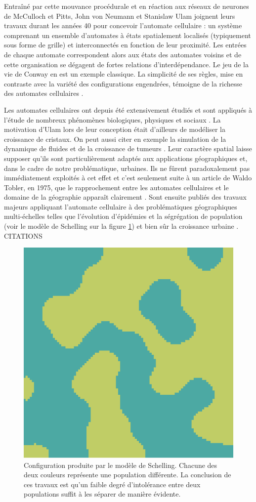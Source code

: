 \documentclass[12pt]{article}
\begin{document}
Entraîné par cette mouvance procédurale et en réaction aux réseaux de
neurones de McCulloch et Pitts, John von Neumann et Stanislaw Ulam
joignent leurs travaux durant les années 40 pour concevoir l'automate
cellulaire : un système comprenant un ensemble d'automates à états
spatialement localisés (typiquement sous forme de grille) et
interconnectés en fonction de leur proximité. Les entrées de chaque
automate correspondent alors aux états des automates voisins et de
cette organisation se dégagent de fortes relations
d'interdépendance. Le jeu de la vie de Conway en est un exemple
classique. La simplicité de ses règles, mise en contraste avec la
variété des configurations engendrées, témoigne de la richesse des
automates cellulaires \cite{Gardner1970}.

Les automates cellulaires ont depuis été extensivement étudiés et sont
appliqués à l'étude de nombreux phénomènes biologiques, physiques et
sociaux \cite{Ganguly2003}. La motivation d'Ulam lors de leur
conception était d'ailleurs de modéliser la croissance de cristaux. On
peut aussi citer en exemple la simulation de la dynamique de fluides
\cite{Frisch1986} et de la croissance de tumeurs
\cite{Kansal2000}. Leur caractère spatial laisse supposer qu'ils sont
particulièrement adaptés aux applications géographiques et, dans le
cadre de notre problématique, urbaines. Ils ne fûrent paradoxalement
pas immédiatement exploités à cet effet et c'est seulement suite à un
article de Waldo Tobler, en 1975, que le rapprochement entre les
automates cellulaires et le domaine de la géographie apparaît
clairement \cite{Tobler1975}. Sont ensuite publiés des travaux majeurs
appliquant l'automate cellulaire à des problématiques géographiques
multi-échelles telles que l'évolution d'épidémies \cite{Fu2003} et la
ségrégation de population \cite{Schelling1969} (voir le modèle de
Schelling sur la figure \ref{fig:schelling}) et bien sûr la croissance
urbaine \cite{}. CITATIONS

\begin{figure}[H]
  \centering
  \includegraphics[width=.5\linewidth]{images/schelling.png}
  \caption{Configuration produite par le modèle de Schelling. Chacune
    des deux couleurs représente une population différente. La
    conclusion de ces travaux est qu'un faible degré d'intolérance
    entre deux populations suffit à les séparer de manière évidente.}
  \label{fig:schelling}
\end{figure}
\end{document}
